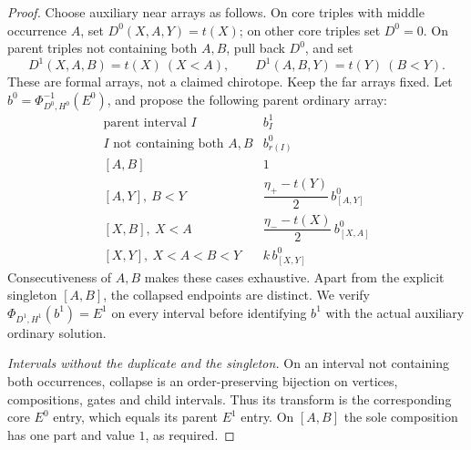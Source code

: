 \begin{proof}
Choose auxiliary near arrays as follows. On core triples with middle
occurrence $A$, set $D^0(X,A,Y)=t(X)$; on other core triples set $D^0=0$.
On parent triples not containing both $A,B$, pull back $D^0$, and set
\begin{equation}\label{aspr:near-data}
D^1(X,A,B)=t(X)\ (X<A),\qquad
D^1(A,B,Y)=t(Y)\ (B<Y).
\end{equation}
These are formal arrays, not a claimed chirotope. Keep the far arrays
fixed. Let $b^0=\Phi_{D^0,H^0}^{-1}(E^0)$, and propose the following
parent ordinary array:
\begin{equation}\label{aspr:ordinary-table}
\begin{array}{c|c}
\text{parent interval }I&b^1_I\\\hline
I\text{ not containing both }A,B&b^0_{r(I)}\\
{[A,B]}&1\\
{[A,Y]},\ B<Y&\dfrac{\eta_+-t(Y)}2\,b^0_{[A,Y]}\\
{[X,B]},\ X<A&\dfrac{\eta_--t(X)}2\,b^0_{[X,A]}\\
{[X,Y]},\ X<A<B<Y&k\,b^0_{[X,Y]}
\end{array}
\end{equation}
Consecutiveness of $A,B$ makes these cases exhaustive. Apart from the
explicit singleton $[A,B]$, the collapsed endpoints are distinct. We
verify $\Phi_{D^1,H^1}(b^1)=E^1$ on every interval before identifying
$b^1$ with the actual auxiliary ordinary solution.

\emph{Intervals without the duplicate and the singleton.}
On an interval not containing both occurrences, collapse is an
order-preserving bijection on vertices, compositions, gates and child
intervals. Thus its transform is the corresponding core $E^0$ entry,
which equals its parent $E^1$ entry. On $[A,B]$ the sole composition has
one part and value $1$, as required.


\end{proof}
